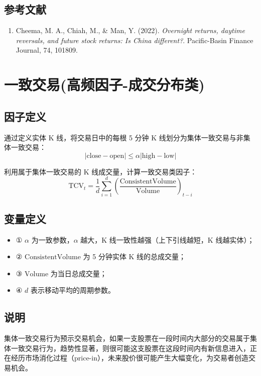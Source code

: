 \documentclass{article}
\begin{document}
\subsection{参考文献}
\begin{enumerate}
    \item Cheema, M. A., Chiah, M., \& Man, Y. (2022). \textit{Overnight returns, daytime reversals, and future stock returns: Is China different?}. Pacific-Basin Finance Journal, 74, 101809.
\end{enumerate}

\section{一致交易(高频因子-成交分布类)}

\subsection{因子定义}

通过定义实体 K 线，将交易日中的每根 5 分钟 K 线划分为集体一致交易与非集体一致交易：
\begin{equation}
    |\mathrm{close} - \mathrm{open}| \leq \alpha |\mathrm{high} - \mathrm{low}|
\end{equation}

利用属于集体一致交易的 K 线成交量，计算一致交易类因子：
\begin{equation}
    \mathrm{TCV}_t = \frac{1}{d} \sum_{i=1}^{d} \left( \frac{\mathrm{ConsistentVolume}}{\mathrm{Volume}} \right)_{t-i}
\end{equation}

\subsection{变量定义}
\begin{itemize}
    \item ① \( \alpha \) 为一致参数，\( \alpha \) 越大，K 线一致性越强（上下引线越短，K 线越实体）；
    \item ② \( \mathrm{ConsistentVolume} \) 为 5 分钟实体 K 线的总成交量；
    \item ③ \( \mathrm{Volume} \) 为当日总成交量；
    \item ④ \( d \) 表示移动平均的周期参数。
\end{itemize}

\subsection{说明}
集体一致交易行为预示交易机会，如果一支股票在一段时间内大部分的交易属于集体一致交易行为，趋势性显著，则很可能这支股票在这段时间内有新信息进入，正在经历市场消化过程（price-in），未来股价很可能产生大幅变化，为交易者创造交易机会。
\end{document}
